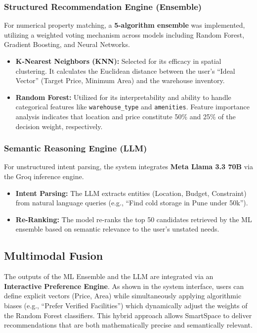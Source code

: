 \documentclass[conference]{IEEEtran}
\begin{document}
\subsubsection{Structured Recommendation Engine (Ensemble)}
For numerical property matching, a \textbf{5-algorithm ensemble} was implemented, utilizing a weighted voting mechanism across models including Random Forest, Gradient Boosting, and Neural Networks.
\begin{itemize}
    \item \textbf{K-Nearest Neighbors (KNN):} Selected for its efficacy in spatial clustering. It calculates the Euclidean distance between the user's ``Ideal Vector'' (Target Price, Minimum Area) and the warehouse inventory.
    \item \textbf{Random Forest:} Utilized for its interpretability and ability to handle categorical features like \texttt{warehouse\_type} and \texttt{amenities}. Feature importance analysis indicates that location and price constitute 50\% and 25\% of the decision weight, respectively.
\end{itemize}

\subsubsection{Semantic Reasoning Engine (LLM)}
For unstructured intent parsing, the system integrates \textbf{Meta Llama 3.3 70B} via the Groq inference engine.
\begin{itemize}
    \item \textbf{Intent Parsing:} The LLM extracts entities (Location, Budget, Constraint) from natural language queries (e.g., ``Find cold storage in Pune under 50k'').
    \item \textbf{Re-Ranking:} The model re-ranks the top 50 candidates retrieved by the ML ensemble based on semantic relevance to the user's unstated needs.
\end{itemize}

\subsection{Multimodal Fusion}
The outputs of the ML Ensemble and the LLM are integrated via an \textbf{Interactive Preference Engine}. As shown in the system interface, users can define explicit vectors (Price, Area) while simultaneously applying algorithmic biases (e.g., ``Prefer Verified Facilities'') which dynamically adjust the weights of the Random Forest classifiers. This hybrid approach allows SmartSpace to deliver recommendations that are both mathematically precise and semantically relevant.
\end{document}
